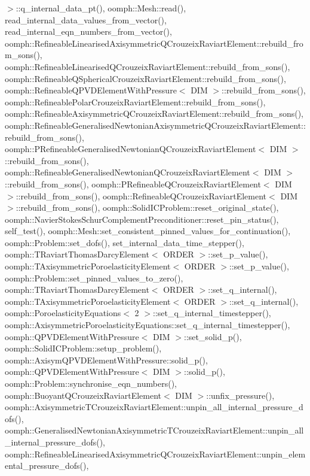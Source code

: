 $>$\+::q\+\_\+internal\+\_\+data\+\_\+pt(), oomph\+::\+Mesh\+::read(), read\+\_\+internal\+\_\+data\+\_\+values\+\_\+from\+\_\+vector(), read\+\_\+internal\+\_\+eqn\+\_\+numbers\+\_\+from\+\_\+vector(), oomph\+::\+Refineable\+Linearised\+Axisymmetric\+Q\+Crouzeix\+Raviart\+Element\+::rebuild\+\_\+from\+\_\+sons(), oomph\+::\+Refineable\+Linearised\+Q\+Crouzeix\+Raviart\+Element\+::rebuild\+\_\+from\+\_\+sons(), oomph\+::\+Refineable\+Q\+Spherical\+Crouzeix\+Raviart\+Element\+::rebuild\+\_\+from\+\_\+sons(), oomph\+::\+Refineable\+Q\+P\+V\+D\+Element\+With\+Pressure$<$ D\+I\+M $>$\+::rebuild\+\_\+from\+\_\+sons(), oomph\+::\+Refineable\+Polar\+Crouzeix\+Raviart\+Element\+::rebuild\+\_\+from\+\_\+sons(), oomph\+::\+Refineable\+Axisymmetric\+Q\+Crouzeix\+Raviart\+Element\+::rebuild\+\_\+from\+\_\+sons(), oomph\+::\+Refineable\+Generalised\+Newtonian\+Axisymmetric\+Q\+Crouzeix\+Raviart\+Element\+::rebuild\+\_\+from\+\_\+sons(), oomph\+::\+P\+Refineable\+Generalised\+Newtonian\+Q\+Crouzeix\+Raviart\+Element$<$ D\+I\+M $>$\+::rebuild\+\_\+from\+\_\+sons(), oomph\+::\+Refineable\+Generalised\+Newtonian\+Q\+Crouzeix\+Raviart\+Element$<$ D\+I\+M $>$\+::rebuild\+\_\+from\+\_\+sons(), oomph\+::\+P\+Refineable\+Q\+Crouzeix\+Raviart\+Element$<$ D\+I\+M $>$\+::rebuild\+\_\+from\+\_\+sons(), oomph\+::\+Refineable\+Q\+Crouzeix\+Raviart\+Element$<$ D\+I\+M $>$\+::rebuild\+\_\+from\+\_\+sons(), oomph\+::\+Solid\+I\+C\+Problem\+::reset\+\_\+original\+\_\+state(), oomph\+::\+Navier\+Stokes\+Schur\+Complement\+Preconditioner\+::reset\+\_\+pin\+\_\+status(), self\+\_\+test(), oomph\+::\+Mesh\+::set\+\_\+consistent\+\_\+pinned\+\_\+values\+\_\+for\+\_\+continuation(), oomph\+::\+Problem\+::set\+\_\+dofs(), set\+\_\+internal\+\_\+data\+\_\+time\+\_\+stepper(), oomph\+::\+T\+Raviart\+Thomas\+Darcy\+Element$<$ O\+R\+D\+E\+R $>$\+::set\+\_\+p\+\_\+value(), oomph\+::\+T\+Axisymmetric\+Poroelasticity\+Element$<$ O\+R\+D\+E\+R $>$\+::set\+\_\+p\+\_\+value(), oomph\+::\+Problem\+::set\+\_\+pinned\+\_\+values\+\_\+to\+\_\+zero(), oomph\+::\+T\+Raviart\+Thomas\+Darcy\+Element$<$ O\+R\+D\+E\+R $>$\+::set\+\_\+q\+\_\+internal(), oomph\+::\+T\+Axisymmetric\+Poroelasticity\+Element$<$ O\+R\+D\+E\+R $>$\+::set\+\_\+q\+\_\+internal(), oomph\+::\+Poroelasticity\+Equations$<$ 2 $>$\+::set\+\_\+q\+\_\+internal\+\_\+timestepper(), oomph\+::\+Axisymmetric\+Poroelasticity\+Equations\+::set\+\_\+q\+\_\+internal\+\_\+timestepper(), oomph\+::\+Q\+P\+V\+D\+Element\+With\+Pressure$<$ D\+I\+M $>$\+::set\+\_\+solid\+\_\+p(), oomph\+::\+Solid\+I\+C\+Problem\+::setup\+\_\+problem(), oomph\+::\+Axisym\+Q\+P\+V\+D\+Element\+With\+Pressure\+::solid\+\_\+p(), oomph\+::\+Q\+P\+V\+D\+Element\+With\+Pressure$<$ D\+I\+M $>$\+::solid\+\_\+p(), oomph\+::\+Problem\+::synchronise\+\_\+eqn\+\_\+numbers(), oomph\+::\+Buoyant\+Q\+Crouzeix\+Raviart\+Element$<$ D\+I\+M $>$\+::unfix\+\_\+pressure(), oomph\+::\+Axisymmetric\+T\+Crouzeix\+Raviart\+Element\+::unpin\+\_\+all\+\_\+internal\+\_\+pressure\+\_\+dofs(), oomph\+::\+Generalised\+Newtonian\+Axisymmetric\+T\+Crouzeix\+Raviart\+Element\+::unpin\+\_\+all\+\_\+internal\+\_\+pressure\+\_\+dofs(), oomph\+::\+Refineable\+Linearised\+Axisymmetric\+Q\+Crouzeix\+Raviart\+Element\+::unpin\+\_\+elemental\+\_\+pressure\+\_\+dofs(), 